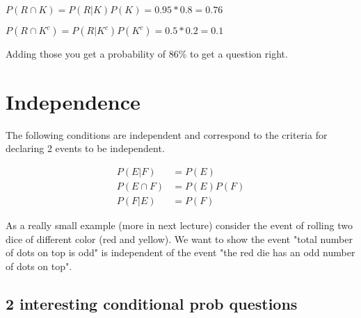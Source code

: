 \documentclass[12pt]{article}
\begin{document}
$P(R \cap K) = P(R|K)P(K) = 0.95 * 0.8 = 0.76$

$P(R \cap K^c) = P(R|K^c)P(K^c) = 0.5 * 0.2 = 0.1$

Adding those you get a probability of 86\% to get a question right.

\section*{Independence}

The following conditions are independent and correspond to the criteria for declaring 2 events to be independent.

\begin{align*}
P(E|F) &= P(E) \\
P(E \cap F) &= P(E)P(F) \\
P(F|E) &= P(F)
\end{align*}

\medskip

As a really small example (more in next lecture) consider the event of rolling two dice of different color (red and yellow). We want to show the event "total number of dots on top is odd" is independent of the event "the red die has an odd number of dots on top".


\subsection*{2 interesting conditional prob questions}
\end{document}
